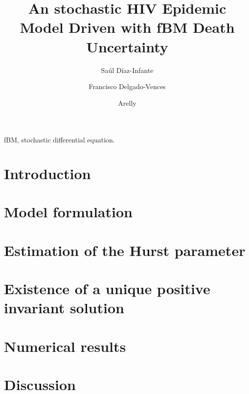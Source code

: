 \documentclass[3p,sort&compress,times]{elsarticle}
\DeclareRobustCommand{\1}[1]{\ensuremath \mathbbm{1}_{\{#1\}}}
\begin{document}
  \begin{frontmatter}
     \author[add:conacyt_unison]{%
      Sa\'ul D\'iaz-Infante
    }%
    \author[add:conacyt_unam]{%
      Francisco Delgado-Vences
    }%
    \author[add:institution]{%
      Arelly 
    }%
    \address[add:conacyt_unison]{
      CONACYT-Universidad de Sonora, Departamento de Matem\'aticas, Boulevard
      Luis Encinas y Rosales S/N, Col. Centro, Hermosillo, Sonora, 
      M\'exico.
    }
    \address[add:conacyt_unam]{
      CONACYT-UNAM, Instituto de Matem\'aticas, Sede
      Oaxaca, M\'exico.
    }
  \title{An stochastic HIV Epidemic Model Driven with fBM Death Uncertainty}
  \begin{abstract}
  \end{abstract}%

  \begin{keyword}
    fBM, stochastic differential equation.
  \end{keyword}
\end{frontmatter}
  \section{Introduction} 
    \label{sec:intro}
  \section{Model formulation} 
    \label{sec:model_formulation}
    
  \section{Estimation of the Hurst parameter}
    \label{sec:hurst_parameter}
  \section{Existence of a unique positive invariant solution} 
    \label{sec:existence}
  \section{Numerical results} 
    \label{sec:numerical_results}
  \section{Discussion}
  \nocite{*}
   
  
\end{document}

